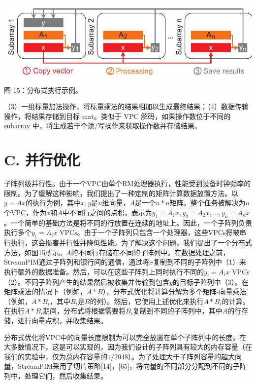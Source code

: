 \documentclass[10pt]{article}
\begin{document}
\begin{center}
\includegraphics[max width=\textwidth]{2024_05_12_abeba8a85da5b5ec4c7bg-08}
\end{center}


图 15：分布式执行示例。

（3）一组标量加法操作，将标量乘法的结果相加以生成最终结果；（4）数据传输操作，将结果存储到目标 mat。类似于 VPC 解码，如果操作数位于不同的 subarray 中，将生成若干个读/写操作来获取操作数并存储结果。
\section*{C. 并行优化}

子阵列级并行性。由于一个VPC由单个RM处理器执行，性能受到设备时钟频率的限制。为了缓解这种影响，我们提出了一种定制的矩阵计算数据放置方法。以$y=A x$的执行为例，其中$x, y$是$n$维向量，$A$是一个$n * n$矩阵。整个任务被解决为$n$个VPC，作为$x$和$A$中不同行之间的点积，表示为$y_{1}=A_{1} x, y_{2}=A_{2} x, \ldots, y_{n}=A_{n} x$。一个简单的基础方法是将不同的行放置在连续的地址上。因此，一个子阵列负责执行多个$y_{i}=A_{i} x$ VPCs。由于一个子阵列只包含一个处理器，这些VPCs将被串行执行，这会损害并行性并降低性能。为了解决这个问题，我们提出了一个分布式方法，如图15所示。$A$的不同行存储在不同的子阵列中。在数据处理之前，StreamPIM通过子阵列和银行间的通信，通过将$x$复制到不同的子阵列中（1）来执行额外的数据准备。然后，可以在这些子阵列上同时执行不同的$y_{i}=A_{i} x$ VPCs（2）。不同子阵列产生的结果然后被收集并传输到包含$y$的目标子阵列中（3）。在矩阵乘法的情况下（例如，$A * B$），分布式优化将计算分解为多个矩阵-向量乘法（例如，$A * B_{i}$，其中$B_{i}$是$B$的列）。然后，它使用上述优化来执行$A * B_{i}$的计算。在执行$A * B_{i}$期间，分布式将根据需要将$B_{i}$复制到不同的子阵列中，其中$A$的行存储，进行向量点积，并收集结果。

分布式优化将VPC中的向量长度限制为可以完全放置在单个子阵列中的长度。在大多数情况下，这是可以实现的，因为我们设计的子阵列具有较大的内存容量（在我们的实验中，仅为总内存容量的$1/2048$）。为了处理大于子阵列容量的超大向量，StreamPIM采用了切片策略[14]，[65]，将向量的不同部分分配到不同的子阵列中，处理它们，然后收集结果。
\end{document}
